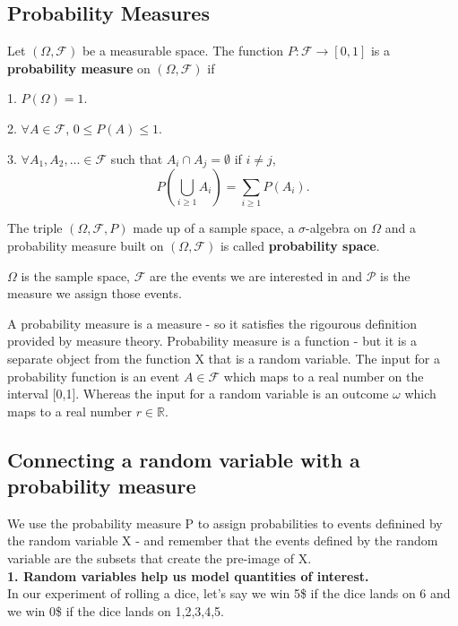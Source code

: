 \documentclass[11pt]{article}
\newcommand{\filt}{\mathcal{F}}
\begin{document}
\subsection{Probability Measures}


Let $(\Omega, \mathcal{F})$ be a measurable space. The function $P: \mathcal{F} \to [0, 1]$ is a \textbf{probability measure} on $(\Omega, \mathcal{F})$ if

    1. $P(\Omega) = 1$.
    
    2. $\forall A \in \mathcal{F}$, $0 \leq P(A) \leq 1$.

    3. $\forall A_1, A_2, \ldots \in \mathcal{F}$ such that $A_i \cap A_j = \emptyset$ if $i \neq j$,
    \[
    P\left(\bigcup_{i \geq 1} A_i\right) = \sum_{i \geq 1} P(A_i).
    \]
    

    
The triple $(\Omega, \mathcal{F}, P)$ made up of a sample space, a $\sigma$-algebra on $\Omega$ and a probability measure built on $(\Omega, \mathcal{F})$ is called \textbf{probability space}.

$\Omega$ is the sample space, $\filt$ are the events we are interested in and $\mathcal{P}$ is the measure we assign those events. 

A probability measure is a measure - so it satisfies the rigourous definition provided by measure theory. Probability measure is a function - but it is a separate object from the function X that is a random variable. The input for a probability function is an event $A \in \filt$ which maps to a real number on the interval [0,1]. Whereas the input for a random variable is an outcome $\omega$ which maps to a real number $r \in \mathbb{R}$.


\subsection{Connecting a random variable with a probability measure}

We use the probability measure P to assign probabilities to events definined by the random variable X - and remember that the events defined by the random variable are the subsets that create the pre-image of X. \\

\textbf{1. Random variables help us model quantities of interest.} \\

In our experiment of rolling a dice, let's say we win 5\$ if the dice lands on 6 and we win 0\$ if the dice lands on 1,2,3,4,5.
\end{document}
